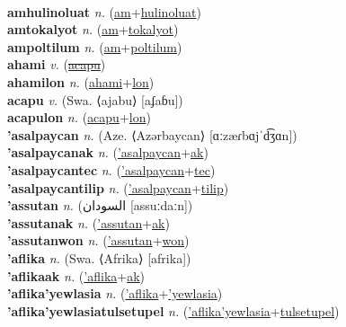  \label{amhilalon} \\
\textbf{amhulinoluat} \textit{n.} (\hyperref[am]{am}+\hyperref[hulinoluat]{hulinoluat})
 \label{amhulinoluat} \\
\textbf{amtokalyot} \textit{n.} (\hyperref[am]{am}+\hyperref[tokalyot]{tokalyot})
 \label{amtokalyot} \\
\textbf{ampoltilum} \textit{n.} (\hyperref[am]{am}+\hyperref[poltilum]{poltilum})
 \label{ampoltilum} \\
\textbf{ahami} \textit{v.} (\hyperref[acapu]{\sout{acapu}})
 \label{ahami} \\
\textbf{ahamilon} \textit{n.} (\hyperref[ahami]{ahami}+\hyperref[lon]{lon})
 \label{ahamilon} \\
\textbf{acapu} \textit{v.} (Swa. ⟨ajabu⟩ [aʄaɓu])
 \label{acapu} \\
\textbf{acapulon} \textit{n.} (\hyperref[acapu]{acapu}+\hyperref[lon]{lon})
 \label{acapulon} \\
\textbf{'asalpaycan} \textit{n.} (Aze. ⟨Azərbaycan⟩ [ɑːzæɾbɑjˈd͡ʒɑn])
 \label{'asalpaycan} \\
\textbf{'asalpaycanak} \textit{n.} (\hyperref['asalpaycan]{'asalpaycan}+\hyperref[ak]{ak})
 \label{'asalpaycanak} \\
\textbf{'asalpaycantec} \textit{n.} (\hyperref['asalpaycan]{'asalpaycan}+\hyperref[tec]{tec})
 \label{'asalpaycantec} \\
\textbf{'asalpaycantilip} \textit{n.} (\hyperref['asalpaycan]{'asalpaycan}+\hyperref[tilip]{tilip})
 \label{'asalpaycantilip} \\
\textbf{'assutan} \textit{n.} ({\arabics{}السودان‎} [assuːdaːn])
 \label{'assutan} \\
\textbf{'assutanak} \textit{n.} (\hyperref['assutan]{'assutan}+\hyperref[ak]{ak})
 \label{'assutanak} \\
\textbf{'assutanwon} \textit{n.} (\hyperref['assutan]{'assutan}+\hyperref[won]{won})
 \label{'assutanwon} \\
\textbf{'aflika} \textit{n.} (Swa. ⟨Afrika⟩ [afrika])
 \label{'aflika} \\
\textbf{'aflikaak} \textit{n.} (\hyperref['aflika]{'aflika}+\hyperref[ak]{ak})
 \label{'aflikaak} \\
\textbf{'aflika'yewlasia} \textit{n.} (\hyperref['aflika]{'aflika}+\hyperref['yewlasia]{'yewlasia})
 \label{'aflika'yewlasia} \\
\textbf{'aflika'yewlasiatulsetupel} \textit{n.} (\hyperref['aflika'yewlasia]{'aflika'yewlasia}+\hyperref[tulsetupel]{tulsetupel})
